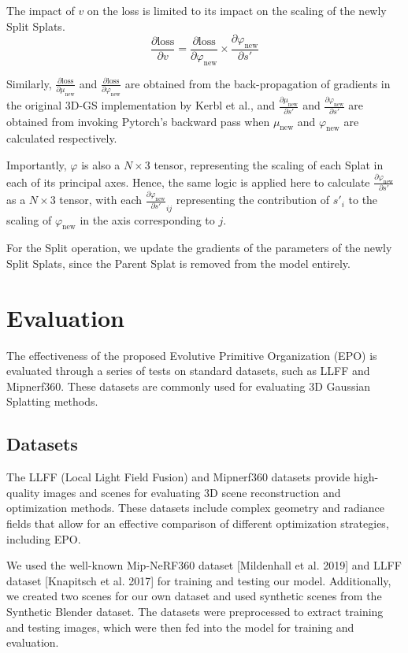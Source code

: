 \documentclass[11pt]{report}
\begin{document}
The impact of $v$ on the loss is limited to its impact on the scaling of the newly Split Splats.
\[ \frac{\partial \text{loss}}{\partial v} = \frac{\partial \text{loss}}{\partial \varphi_{\text{new}}} \times \frac{\partial \varphi_{\text{new}}}{\partial s'} \]

Similarly, $\frac{\partial \text{loss}}{\partial \mu_{\text{new}}}$ and $\frac{\partial \text{loss}}{\partial \varphi_{\text{new}}}$ are obtained from the back-propagation of gradients in the original 3D-GS implementation by Kerbl et al., and $\frac{\partial \mu_{\text{new}}}{\partial s'}$ and $\frac{\partial \varphi_{\text{new}}}{\partial s'}$ are obtained from invoking Pytorch's backward pass when $\mu_{\text{new}}$ and $\varphi_{\text{new}}$ are calculated respectively.

Importantly, $\varphi$ is also a $N \times 3$ tensor, representing the scaling of each Splat in each of its principal axes. Hence, the same logic is applied here to calculate $\frac{\partial \varphi_{\text{new}}}{\partial s'}$ as a $N \times 3$ tensor, with each $\frac{\partial \varphi_{\text{new}}}{\partial s'}_{ij}$ representing the contribution of $s'_{i}$ to the scaling of $\varphi_{\text{new}}$ in the axis corresponding to $j$.

For the Split operation, we update the gradients of the parameters of the newly Split Splats, since the Parent Splat is removed from the model entirely.

\chapter{Evaluation}
The effectiveness of the proposed Evolutive Primitive Organization (EPO) is evaluated through a series of tests on standard datasets, such as LLFF and Mipnerf360. These datasets are commonly used for evaluating 3D Gaussian Splatting methods.


\section{Datasets}
The LLFF (Local Light Field Fusion) and Mipnerf360 datasets provide high-quality images and scenes for evaluating 3D scene reconstruction and optimization methods. These datasets include complex geometry and radiance fields that allow for an effective comparison of different optimization strategies, including EPO.

We used the well-known Mip-NeRF360 dataset [Mildenhall et al. 2019] and LLFF dataset [Knapitsch et al. 2017] for training and testing our model. Additionally, we created two scenes for our own dataset and used synthetic scenes from the Synthetic Blender dataset. The datasets were preprocessed to extract training and testing images, which were then fed into the model for training and evaluation.
\end{document}
